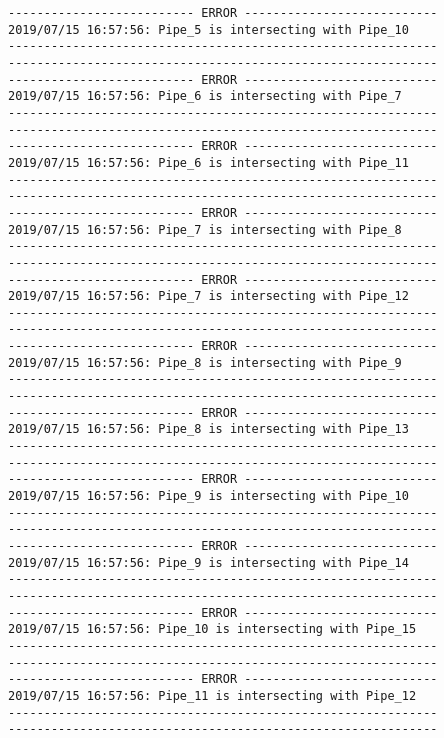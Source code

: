\documentclass{article}
\begin{document}
{\begin{verbatim}
-------------------------- ERROR ---------------------------
2019/07/15 16:57:56: Pipe_5 is intersecting with Pipe_10
------------------------------------------------------------
------------------------------------------------------------
-------------------------- ERROR ---------------------------
2019/07/15 16:57:56: Pipe_6 is intersecting with Pipe_7
------------------------------------------------------------
------------------------------------------------------------
-------------------------- ERROR ---------------------------
2019/07/15 16:57:56: Pipe_6 is intersecting with Pipe_11
------------------------------------------------------------
------------------------------------------------------------
-------------------------- ERROR ---------------------------
2019/07/15 16:57:56: Pipe_7 is intersecting with Pipe_8
------------------------------------------------------------
------------------------------------------------------------
-------------------------- ERROR ---------------------------
2019/07/15 16:57:56: Pipe_7 is intersecting with Pipe_12
------------------------------------------------------------
------------------------------------------------------------
-------------------------- ERROR ---------------------------
2019/07/15 16:57:56: Pipe_8 is intersecting with Pipe_9
------------------------------------------------------------
------------------------------------------------------------
-------------------------- ERROR ---------------------------
2019/07/15 16:57:56: Pipe_8 is intersecting with Pipe_13
------------------------------------------------------------
------------------------------------------------------------
-------------------------- ERROR ---------------------------
2019/07/15 16:57:56: Pipe_9 is intersecting with Pipe_10
------------------------------------------------------------
------------------------------------------------------------
-------------------------- ERROR ---------------------------
2019/07/15 16:57:56: Pipe_9 is intersecting with Pipe_14
------------------------------------------------------------
------------------------------------------------------------
-------------------------- ERROR ---------------------------
2019/07/15 16:57:56: Pipe_10 is intersecting with Pipe_15
------------------------------------------------------------
------------------------------------------------------------
-------------------------- ERROR ---------------------------
2019/07/15 16:57:56: Pipe_11 is intersecting with Pipe_12
------------------------------------------------------------
------------------------------------------------------------

\end{verbatim}}
\end{document}
